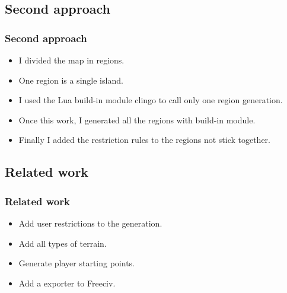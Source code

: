 \subsection{Second approach}

\begin{frame}
\frametitle{Second approach}

\begin{itemize}
	\item<1-> I divided the map in regions.
	\item<2-> One region is a single island.
	\item<3-> I used the Lua build-in module clingo to call only one region generation.
	\item<4-> Once this work, I generated all the regions with build-in module.
	\item<5-> Finally I added the restriction rules to the regions not stick together.
\end{itemize}

\end{frame}

\subsection{Related work}

\begin{frame}
\frametitle{Related work}

\begin{itemize}
	\item<1-> Add user restrictions to the generation.
	\item<2-> Add all types of terrain.
	\item<3-> Generate player starting points.
	\item<4-> Add a exporter to Freeciv.
\end{itemize}

\end{frame}